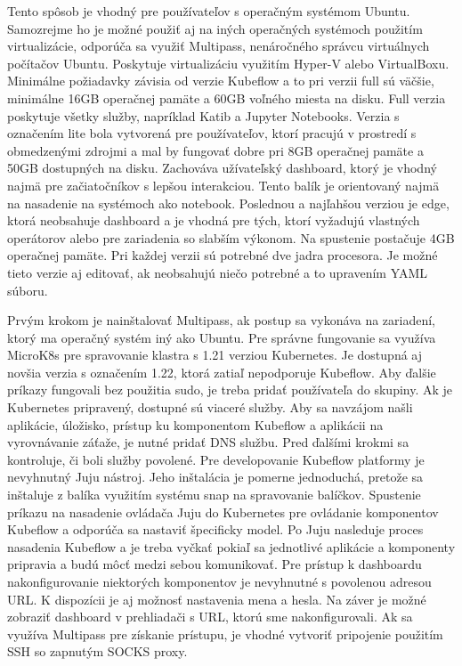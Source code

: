 Tento spôsob je vhodný pre používateľov s operačným systémom Ubuntu. Samozrejme ho je možné použiť aj na iných operačných systémoch použitím virtualizácie, odporúča sa využiť Multipass, nenáročného správcu virtuálnych počítačov Ubuntu. Poskytuje virtualizáciu využitím Hyper-V alebo VirtualBoxu. Minimálne požiadavky závisia od verzie Kubeflow a to pri verzii full sú väčšie, minimálne 16GB operačnej pamäte a 60GB voľného miesta na disku. Full verzia poskytuje všetky služby, napríklad Katib a Jupyter Notebooks. Verzia s označením lite bola vytvorená pre používateľov, ktorí pracujú v prostredí s obmedzenými zdrojmi a mal by fungovať dobre pri 8GB operačnej pamäte a 50GB dostupných na disku. Zachováva užívateľský dashboard, ktorý je vhodný najmä pre začiatočníkov s lepšou interakciou. Tento balík je orientovaný najmä na nasadenie na systémoch ako notebook. Poslednou a najľahšou verziou je edge, ktorá neobsahuje dashboard a je vhodná pre tých, ktorí vyžadujú vlastných operátorov alebo pre zariadenia so slabším výkonom. Na spustenie postačuje 4GB operačnej pamäte. Pri každej verzii sú potrebné dve jadra procesora. Je možné tieto verzie aj editovať, ak neobsahujú niečo potrebné a to upravením YAML súboru.

Prvým krokom je nainštalovať Multipass, ak postup sa vykonáva na zariadení, ktorý ma operačný systém iný ako Ubuntu. Pre správne fungovanie sa využíva MicroK8s pre spravovanie klastra s 1.21 verziou Kubernetes. Je dostupná aj novšia verzia s označením 1.22, ktorá zatiaľ nepodporuje Kubeflow. Aby ďalšie príkazy fungovali bez použitia sudo, je treba pridať používateľa do skupiny. Ak je Kubernetes pripravený, dostupné sú viaceré služby. Aby sa navzájom našli aplikácie, úložisko, prístup ku komponentom Kubeflow a aplikácii na vyrovnávanie záťaže, je nutné pridať DNS službu. Pred ďalšími krokmi sa kontroluje, či boli služby povolené. Pre developovanie Kubeflow platformy je nevyhnutný Juju nástroj. Jeho inštalácia je pomerne jednoduchá, pretože sa inštaluje z balíka využitím systému snap na spravovanie balíčkov. Spustenie príkazu na nasadenie ovládača Juju do Kubernetes pre ovládanie komponentov Kubeflow a odporúča sa nastaviť špecificky model. Po Juju nasleduje proces nasadenia Kubeflow a je treba vyčkať pokiaľ sa jednotlivé aplikácie a komponenty pripravia a budú môcť medzi sebou komunikovať. Pre prístup k dashboardu nakonfigurovanie niektorých komponentov je nevyhnutné s povolenou adresou URL. K dispozícii je aj možnosť nastavenia mena a hesla. Na záver je možné zobraziť dashboard v prehliadači s URL, ktorú sme nakonfigurovali. Ak sa využíva Multipass pre získanie prístupu, je vhodné vytvoriť pripojenie použitím SSH so zapnutým SOCKS proxy.

